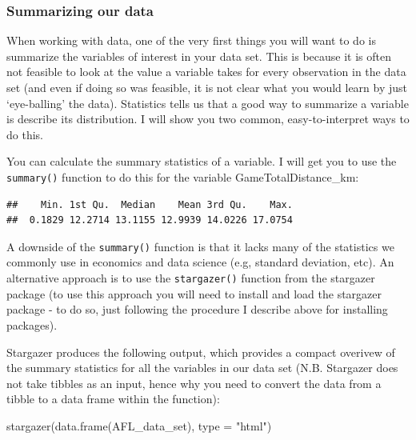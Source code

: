 \documentclass[
]{article}
\newenvironment{Shaded}{\begin{snugshade}}{\end{snugshade}}
\newcommand{\AttributeTok}[1]{\textcolor[rgb]{0.77,0.63,0.00}{#1}}
\newcommand{\FunctionTok}[1]{\textcolor[rgb]{0.00,0.00,0.00}{#1}}
\newcommand{\NormalTok}[1]{#1}
\newcommand{\SpecialCharTok}[1]{\textcolor[rgb]{0.00,0.00,0.00}{#1}}
\newcommand{\StringTok}[1]{\textcolor[rgb]{0.31,0.60,0.02}{#1}}
\begin{document}
\hypertarget{summarizing-our-data}{%
\subsubsection{Summarizing our data}\label{summarizing-our-data}}

When working with data, one of the very first things you will want to do
is summarize the variables of interest in your data set. This is because
it is often not feasible to look at the value a variable takes for every
observation in the data set (and even if doing so was feasible, it is
not clear what you would learn by just `eye-balling' the data).
Statistics tells us that a good way to summarize a variable is describe
its distribution. I will show you two common, easy-to-interpret ways to
do this.

You can calculate the summary statistics of a variable. I will get you
to use the \texttt{summary()} function to do this for the variable
GameTotalDistance\_km:

\begin{Shaded}
\end{Shaded}

\begin{verbatim}
##    Min. 1st Qu.  Median    Mean 3rd Qu.    Max. 
##  0.1829 12.2714 13.1155 12.9939 14.0226 17.0754
\end{verbatim}

A downside of the \texttt{summary()} function is that it lacks many of
the statistics we commonly use in economics and data science (e.g,
standard deviation, etc). An alternative approach is to use the
\texttt{stargazer()} function from the stargazer package (to use this
approach you will need to install and load the stargazer package - to do
so, just following the procedure I describe above for installing
packages).

Stargazer produces the following output, which provides a compact
overivew of the summary statistics for all the variables in our data set
(N.B. Stargazer does not take tibbles as an input, hence why you need to
convert the data from a tibble to a data frame within the function):

\begin{Shaded}
\begin{Highlighting}[]
\FunctionTok{stargazer}\NormalTok{(}\FunctionTok{data.frame}\NormalTok{(AFL\_data\_set), }\AttributeTok{type =} \StringTok{"html"}\NormalTok{)}
\end{Highlighting}
\end{Shaded}
\end{document}
